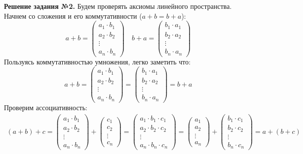 \documentclass[a4paper, 12pt]{article}
\begin{document}
\textbf{Решение задания №2.} Будем проверять аксиомы линейного пространства. Начнем со сложения и его коммутативности ($a + b = b + a$):
\[
a + b = 
\begin{pmatrix}
    a_1 \cdot b_1 \\
    a_2 \cdot b_2 \\ 
    \vdots \\
    a_n \cdot b_n 
\end{pmatrix}
\quad 
b + a = 
\begin{pmatrix}
    b_1 \cdot a_1 \\
    b_2 \cdot a_2 \\ 
    \vdots \\
    b_n \cdot a_n 
\end{pmatrix}
\]
Пользуясь коммутативностью умножения, легко заметить что:
\[
a + b = 
\begin{pmatrix}
    a_1 \cdot b_1 \\
    a_2 \cdot b_2 \\ 
    \vdots \\
    a_n \cdot b_n 
\end{pmatrix}
= \begin{pmatrix}
    b_1 \cdot a_1 \\
    b_2 \cdot a_2 \\ 
    \vdots \\
    b_n \cdot a_n 
\end{pmatrix}
= b + a
\]
Проверим ассоциативность:
\begin{gather*}
(a + b) + c = 
\begin{pmatrix}
    a_1 \cdot b_1 \\
    a_2 \cdot b_2 \\ 
    \vdots \\
    a_n \cdot b_n 
\end{pmatrix}
+ 
\begin{pmatrix}
    c_1 \\ 
    c_2 \\  
    \vdots \\
    c_n  
\end{pmatrix}
=
\begin{pmatrix}
    a_1 \cdot b_1 \cdot c_1 \\
    a_2 \cdot b_2 \cdot c_2 \\ 
    \vdots \\
    a_n \cdot b_n \cdot c_n
\end{pmatrix} 
=
\begin{pmatrix}
    a_1  \\
    a_2  \\ 
    \vdots \\
    a_n  
\end{pmatrix}
+ 
\begin{pmatrix}
    b_1 \cdot c_1 \\ 
    b_2 \cdot c_2 \\  
    \vdots \\
    b_n \cdot c_n 
\end{pmatrix} = 
a + (b + c)
\end{gather*}
\end{document}
